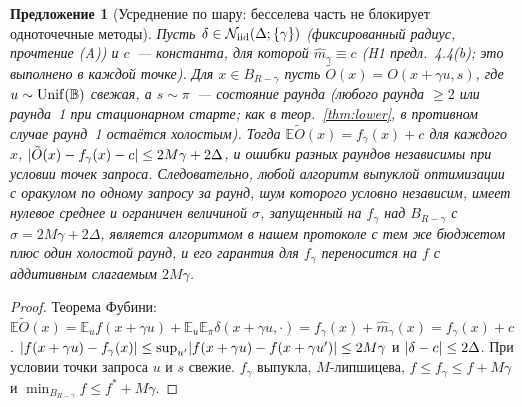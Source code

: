 \documentclass[11pt,a4paper]{article}
\numberwithin{equation}{section}
\newtheorem{proposition}[theorem]{Предложение}
\theoremstyle{definition}
\theoremstyle{remark}
\newcommand{\E}{\mathbb E}\newcommand{\R}{\mathbb R}\newcommand{\Z}{\mathbb Z}\let\Prob\relax\newcommand{\Prob}{\mathbb P}
\newcommand{\cN}{\mathcal N}\newcommand{\cA}{\mathcal A}\newcommand{\cG}{\mathcal G}\newcommand{\cF}{\mathcal F}
\newcommand{\Unif}{\mathrm{Unif}}\newcommand{\TV}{\mathrm{TV}}\newcommand{\BC}{\mathrm{BC}}\newcommand{\tmix}{t_{\rm mix}}
\begin{document}
\begin{proposition}[Усреднение по шару: бесселева часть не блокирует одноточечные методы]\label{prop:ballavg}
Пусть $\delta\in\cN_\iid(\Delta;\{\gamma\})$ (фиксированный радиус, прочтение (A)) и $c$~--- константа, для которой $\hat m_\gamma\equiv c$ (H1 предл.~4.4(b); это выполнено в \emph{каждой} точке). Для $x\in B_{R-\gamma}$ пусть $\tilde O(x)=O(x+\gamma u,s)$, где $u\sim\Unif(\Ball)$ свежая, а $s\sim\pi$~--- состояние раунда (любого раунда $\ge2$ или раунда~1 при стационарном старте; как в теор.~\ref{thm:lower}, в противном случае раунд~1 остаётся холостым). Тогда $\E\tilde O(x)=f_\gamma(x)+c$ для каждого $x$, $\lvert \tilde O(x)-f_\gamma(x)-c\rvert\le2M\gamma+2\Delta$, и ошибки разных раундов независимы при условии точек запроса. Следовательно, любой алгоритм выпуклой оптимизации с оракулом по одному запросу за раунд, шум которого условно независим, имеет нулевое среднее и ограничен величиной $\sigma$, запущенный на $f_\gamma$ над $B_{R-\gamma}$ с $\sigma=2M\gamma+2\Delta$, является алгоритмом в нашем протоколе с тем же бюджетом плюс один холостой раунд, и его гарантия для $f_\gamma$ переносится на $f$ с аддитивным слагаемым $2M\gamma$.
\end{proposition}
\begin{proof}
Теорема Фубини: $\E\tilde O(x)=\E_uf(x+\gamma u)+\E_u\E_\pi\delta(x+\gamma u,\cdot)=f_\gamma(x)+\hat m_\gamma(x)=f_\gamma(x)+c$. $\lvert f(x+\gamma u)-f_\gamma(x)\rvert\le\sup_{u'}\lvert f(x+\gamma u)-f(x+\gamma u')\rvert\le2M\gamma$ и $\lvert \delta-c\rvert\le2\Delta$. При условии точки запроса $u$ и $s$ свежие. $f_\gamma$ выпукла, $M$-липшицева, $f\le f_\gamma\le f+M\gamma$ и $\min_{B_{R-\gamma}}f\le f^*+M\gamma$.
\end{proof}
\end{document}
